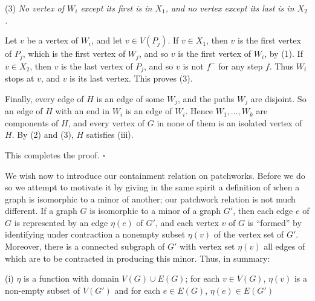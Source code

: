 {\hspace*{12pt}(3) \textit{No vertex of $W_i$ except its first is in $X_1$, and no vertex except its
last is in $X_2$.}

Let $v$ be a vertex of $W_i$, and let $v \in V(P_j)$. If $v \in X_1$, then $v$ is the first vertex
of $P_j$, which is the first vertex of $W_j$, and so $v$ is the first vertex of $W_i$, by (1). If
$v \in X_2$, then $v$ is the last vertex of $P_j$, and so $v$ is not $f^-$ for any step $f$. Thus
$W_i$ stops at $v$, and $v$ is its last vertex. This proves (3).

Finally, every edge of $H$ is an edge of some $W_j$, and the paths $W_j$ are disjoint. So an edge
of $H$ with an end in $W_i$ is an edge of $W_i$. Hence $W_1, \dots, W_k$ are components of $H$,
and every vertex of $G$ in none of them is an isolated vertex of $H$. By (2) and (3), $H$ satisfies
(iii).}

 This completes the proof. $\square$


We wish now to introduce our containment relation on patchworks. Before we do so we attempt to motivate it by giving in the same spirit a definition of when a graph is isomorphic to a minor of another; our patchwork relation is not much different. If a graph $G$ is isomorphic to a minor of a graph $G'$, then each edge $e$ of $G$ is represented by an edge $\eta(e)$ of $G'$, and each vertex $v$ of $G$ is ``formed'' by identifying under contraction a nonempty subset $\eta(v)$ of the vertex set of $G'$. Moreover, there is a connected subgraph of $G'$ with vertex set $\eta(v)$ all edges of which are to be contracted in producing this minor. Thus, in summary:

\hspace*{12pt}(i) $\eta$ is a function with domain $V(G) \cup E(G)$; for each $v \in V(G)$, $\eta(v)$ is a non-empty subset of $V(G')$ and for each $e \in E(G)$, $\eta(e) \in E(G')$
